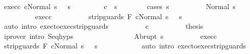 \begin{isabellebody}
\ exec{\isacharunderscore}c{}{\isacharcolon}\ {\isachardoublequoteopen}{\isasymGamma}{\isasymturnstile}{\isasymlangle}c{}{\isacharcomma}Normal\ s{\isacharprime}\ {\isasymrangle}\ {\isasymRightarrow}\ s{\isacharprime}{\isacharprime}{\isachardoublequoteclose}\isanewline
\ \ \ \ \ \ \isamarkupfalse%
\ {\isachardoublequoteopen}\ {\isasymGamma}{\isasymturnstile}c{}\ {\isasymdown}\ s{\isacharprime}{\isacharprime}{\isachardoublequoteclose}\isanewline
\ \ \ \ \ \ \isamarkupfalse%
\ {\isacharparenleft}cases\ s{\isacharprime}{\isacharprime}{\isacharparenright}\isanewline
\ \ \ \ \ \ \ \ \isamarkupfalse%
\ {\isacharparenleft}Normal\ s{\isacharprime}{\isacharprime}{\isacharprime}{\isacharparenright}\isanewline
\ \ \ \ \ \ \ \ \isamarkupfalse%
\ exec{\isacharunderscore}c{}\isanewline
\ \ \ \ \ \ \ \ \isamarkupfalse%
\ {\isachardoublequoteopen}{\isasymGamma}{\isasymturnstile}{\isasymlangle}strip{\isacharunderscore}guards\ F\ c{}{\isacharcomma}Normal\ s{\isacharprime}\ {\isasymrangle}\ {\isasymRightarrow}\ s{\isacharprime}{\isacharprime}{\isachardoublequoteclose}\isanewline
\ \ \ \ \ \ \ \ \ \ \isamarkupfalse%
\ {\isacharparenleft}auto\ intro{\isacharcolon}\ exec{\isacharunderscore}to{\isacharunderscore}exec{\isacharunderscore}strip{\isacharunderscore}guards{\isacharparenright}\isanewline
\ \ \ \ \ \ \ \ \isamarkupfalse%
\ c{}\isanewline
\ \ \ \ \ \ \ \ \isamarkupfalse%
\ {\isacharquery}thesis\isanewline
\ \ \ \ \ \ \ \ \ \ \isamarkupfalse%
\ {\isacharparenleft}iprover\ intro{\isacharcolon}\ Seq{\isachardot}hyps{\isacharparenright}\isanewline
\ \ \ \ \ \ \isamarkupfalse%
\isanewline
\ \ \ \ \ \ \ \ \isamarkupfalse%
\ {\isacharparenleft}Abrupt\ s{\isacharprime}{\isacharprime}{\isacharprime}{\isacharparenright}\isanewline
\ \ \ \ \ \ \ \ \isamarkupfalse%
\ exec{\isacharunderscore}c{}\isanewline
\ \ \ \ \ \ \ \ \isamarkupfalse%
\ {\isachardoublequoteopen}{\isasymGamma}{\isasymturnstile}{\isasymlangle}strip{\isacharunderscore}guards\ F\ c{}{\isacharcomma}Normal\ s{\isacharprime}\ {\isasymrangle}\ {\isasymRightarrow}\ s{\isacharprime}{\isacharprime}{\isachardoublequoteclose}\isanewline
\ \ \ \ \ \ \ \ \ \ \isamarkupfalse%
\ {\isacharparenleft}auto\ intro{\isacharcolon}\ exec{\isacharunderscore}to{\isacharunderscore}exec{\isacharunderscore}strip{\isacharunderscore}guards\ {\isacharparenright}\isanewline

\end{isabellebody}
